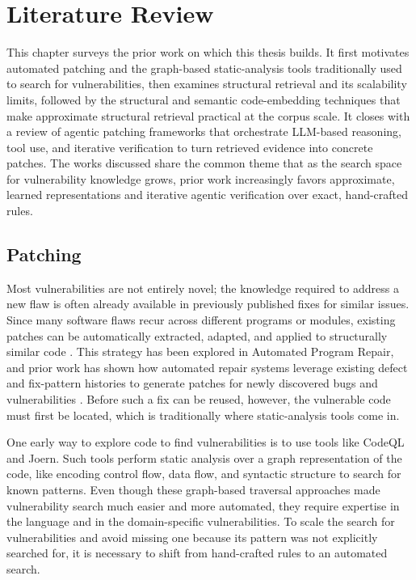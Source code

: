 
\chapter{Literature Review}\label{chapter:literature-review}

This chapter surveys the prior work on which this thesis builds. 
It first motivates automated patching and the graph-based static-analysis tools traditionally used to search for vulnerabilities, then examines structural retrieval and its scalability limits, followed by the structural and semantic code-embedding techniques that make approximate structural retrieval practical at the corpus scale. 
It closes with a review of agentic patching frameworks that orchestrate LLM-based reasoning, tool use, and iterative verification to turn retrieved evidence into concrete patches. 
The works discussed share the common theme that as the search space for vulnerability knowledge grows, prior work increasingly favors approximate, learned representations and iterative agentic verification over exact, hand-crafted rules.

\section{Patching}
Most vulnerabilities are not entirely novel; the knowledge required to address a new flaw is often already available in previously published fixes for similar issues. Since many software flaws recur across different programs or modules, existing patches can be automatically extracted, adapted, and applied to structurally similar code \cite{Shariffdeen2020}.
This strategy has been explored in Automated Program Repair, and prior work has shown how automated repair systems leverage existing defect and fix-pattern histories to generate patches for newly discovered bugs and vulnerabilities \cite{legoues2019}.
Before such a fix can be reused, however, the vulnerable code must first be located, which is traditionally where static-analysis tools come in.

One early way to explore code to find vulnerabilities is to use tools like CodeQL and Joern. 
Such tools perform static analysis over a graph representation of the code, like encoding control flow, data flow, and syntactic structure to search for known patterns.
Even though these graph-based traversal approaches made vulnerability search much easier and more automated, they require expertise in the language and in the domain-specific vulnerabilities. 
To scale the search for vulnerabilities and avoid missing one because its pattern was not explicitly searched for, it is necessary to shift from hand-crafted rules to an automated search.

